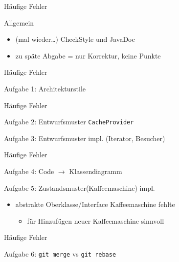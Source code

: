 \documentclass[18pt]{beamer}
\begin{document}
	\begin{frame}{Häufige Fehler}
		\begin{block}{Allgemein}
			\begin{itemize}
				\item (mal wieder\dots) CheckStyle und JavaDoc
				\item zu späte Abgabe = nur Korrektur, keine Punkte
			\end{itemize}
		\end{block}
	\end{frame}

	\begin{frame}{Häufige Fehler}
		\begin{block}{Aufgabe 1: Architekturstile}
		\end{block}
	\end{frame}

	\begin{frame}{Häufige Fehler}
		\begin{block}{Aufgabe 2: Entwurfsmuster \texttt{CacheProvider}}
		\end{block}
		\pause 
		\begin{block}{Aufgabe 3: Entwurfsmuster impl. (Iterator, Besucher)}
		\end{block}
	\end{frame}

	\begin{frame}{Häufige Fehler}
		\begin{block}{Aufgabe 4: Code $\rightarrow$ Klassendiagramm}
		\end{block}
		\pause
		\begin{block}{Aufgabe 5: Zustandsmuster(Kaffeemaschine) impl.}
			\begin{itemize}
				\item abstrakte Oberklasse/Interface Kaffeemaschine fehlte 
				\begin{itemize}
					\item für Hinzufügen neuer Kaffeemaschine sinnvoll
				\end{itemize}
			\end{itemize}
		\end{block}
	\end{frame}

	\begin{frame}{Häufige Fehler}
		\begin{block}{Aufgabe 6: \texttt{git merge} vs \texttt{git rebase}}
		\end{block}
	\end{frame}
\end{document}

